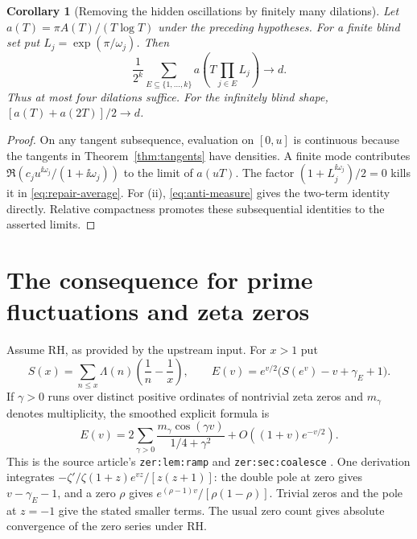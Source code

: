\documentclass[11pt]{article}
\newtheorem{corollary}[theorem]{Corollary}
\theoremstyle{definition}\newtheorem{definition}[theorem]{Definition}
\theoremstyle{remark}\newtheorem{remark}[theorem]{Remark}
\begin{document}
\begin{corollary}[Removing the hidden oscillations by finitely many dilations]
Let $a(T)=\pi A(T)/(T\log T)$ under the preceding hypotheses.
For a finite blind set put $L_j=\exp(\pi/\omega_j)$. Then
\begin{equation}\label{eq:repair-average}
 \frac1{2^k}\sum_{E\subseteq\{1,\ldots,k\}}
 a\left(T\prod_{j\in E}L_j\right)\longrightarrow d.
\end{equation}
Thus at most four dilations suffice. For the infinitely blind shape,
$[a(T)+a(2T)]/2\to d$.
\end{corollary}
\begin{proof}
On any tangent subsequence, evaluation on $[0,u]$ is continuous because
the tangents in Theorem~\ref{thm:tangents} have densities. A finite mode
contributes $\Re(c_j u^{\ii\omega_j}/(1+\ii\omega_j))$ to the limit of
$a(uT)$. The factor $(1+L_j^{\ii\omega_j})/2=0$ kills it in
\eqref{eq:repair-average}. For (ii), \eqref{eq:anti-measure} gives the
two-term identity directly. Relative compactness promotes these
subsequential identities to the asserted limits.
\end{proof}

\section{The consequence for prime fluctuations and zeta zeros}

Assume RH, as provided by the upstream input. For $x>1$ put
\[
 S(x)=\sum_{n\le x}\Lambda(n)\left(\frac1n-\frac1x\right),\qquad
 E(v)=e^{v/2}\bigl(S(e^v)-v+\gamma_E+1\bigr).
\]
If $\gamma>0$ runs over distinct positive ordinates of nontrivial zeta
zeros and $m_\gamma$ denotes multiplicity, the smoothed explicit formula is
\begin{equation}\label{eq:explicit}
 E(v)=2\sum_{\gamma>0}\frac{m_\gamma\cos(\gamma v)}{1/4+\gamma^2}
 +O((1+v)e^{-v/2}).
\end{equation}
This is the source article's \texttt{zer:lem:ramp} and
\texttt{zer:sec:coalesce} \cite{ProveIt}. One derivation integrates
$-\zeta'/\zeta(1+z)e^{vz}/[z(z+1)]$: the double pole at zero gives
$v-\gamma_E-1$, and a zero $\rho$ gives
$e^{(\rho-1)v}/[\rho(1-\rho)]$. Trivial zeros and the pole at $z=-1$
give the stated smaller terms. The usual zero count gives absolute
convergence of the zero series under RH.
\end{document}
